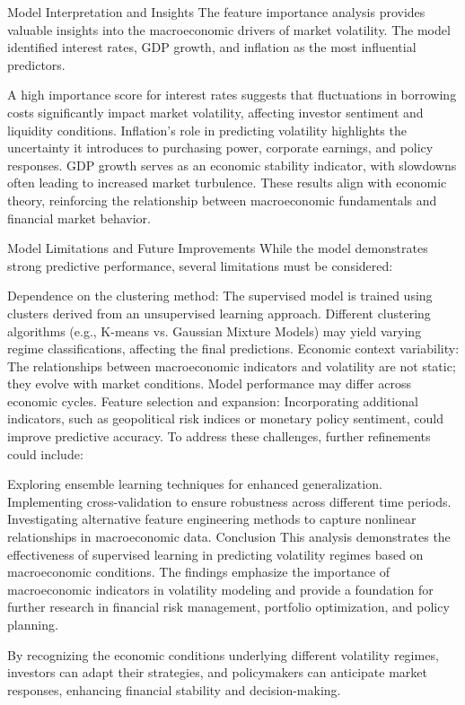 Model Interpretation and Insights
The feature importance analysis provides valuable insights into the macroeconomic drivers of market volatility. The model identified interest rates, GDP growth, and inflation as the most influential predictors.

A high importance score for interest rates suggests that fluctuations in borrowing costs significantly impact market volatility, affecting investor sentiment and liquidity conditions.
Inflation’s role in predicting volatility highlights the uncertainty it introduces to purchasing power, corporate earnings, and policy responses.
GDP growth serves as an economic stability indicator, with slowdowns often leading to increased market turbulence.
These results align with economic theory, reinforcing the relationship between macroeconomic fundamentals and financial market behavior.

Model Limitations and Future Improvements
While the model demonstrates strong predictive performance, several limitations must be considered:

Dependence on the clustering method: The supervised model is trained using clusters derived from an unsupervised learning approach. Different clustering algorithms (e.g., K-means vs. Gaussian Mixture Models) may yield varying regime classifications, affecting the final predictions.
Economic context variability: The relationships between macroeconomic indicators and volatility are not static; they evolve with market conditions. Model performance may differ across economic cycles.
Feature selection and expansion: Incorporating additional indicators, such as geopolitical risk indices or monetary policy sentiment, could improve predictive accuracy.
To address these challenges, further refinements could include:

Exploring ensemble learning techniques for enhanced generalization.
Implementing cross-validation to ensure robustness across different time periods.
Investigating alternative feature engineering methods to capture nonlinear relationships in macroeconomic data.
Conclusion
This analysis demonstrates the effectiveness of supervised learning in predicting volatility regimes based on macroeconomic conditions. The findings emphasize the importance of macroeconomic indicators in volatility modeling and provide a foundation for further research in financial risk management, portfolio optimization, and policy planning.

By recognizing the economic conditions underlying different volatility regimes, investors can adapt their strategies, and policymakers can anticipate market responses, enhancing financial stability and decision-making.